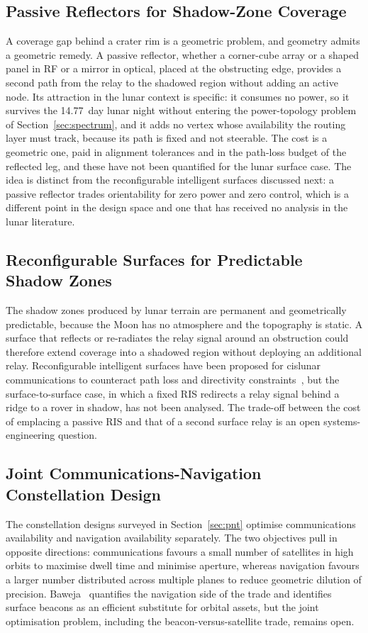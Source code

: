 \documentclass[11pt,a4paper]{article}
\begin{document}
\subsection{Passive Reflectors for Shadow-Zone Coverage}
A coverage gap behind a crater rim is a geometric problem, and geometry admits a geometric remedy. A passive reflector, whether a corner-cube array or a shaped panel in RF or a mirror in optical, placed at the obstructing edge, provides a second path from the relay to the shadowed region without adding an active node. Its attraction in the lunar context is specific: it consumes no power, so it survives the \SI{14.77}{day} lunar night without entering the power-topology problem of Section~\ref{sec:spectrum}, and it adds no vertex whose availability the routing layer must track, because its path is fixed and not steerable. The cost is a geometric one, paid in alignment tolerances and in the path-loss budget of the reflected leg, and these have not been quantified for the lunar surface case. The idea is distinct from the reconfigurable intelligent surfaces discussed next: a passive reflector trades orientability for zero power and zero control, which is a different point in the design space and one that has received no analysis in the lunar literature.

\subsection{Reconfigurable Surfaces for Predictable Shadow Zones}
The shadow zones produced by lunar terrain are permanent and geometrically predictable, because the Moon has no atmosphere and the topography is static. A surface that reflects or re-radiates the relay signal around an obstruction could therefore extend coverage into a shadowed region without deploying an additional relay. Reconfigurable intelligent surfaces have been proposed for cislunar communications to counteract path loss and directivity constraints~\cite{ris_cislunar2024}, but the surface-to-surface case, in which a fixed RIS redirects a relay signal behind a ridge to a rover in shadow, has not been analysed. The trade-off between the cost of emplacing a passive RIS and that of a second surface relay is an open systems-engineering question.

\subsection{Joint Communications-Navigation Constellation Design}
The constellation designs surveyed in Section~\ref{sec:pnt} optimise communications availability and navigation availability separately. The two objectives pull in opposite directions: communications favours a small number of satellites in high orbits to maximise dwell time and minimise aperture, whereas navigation favours a larger number distributed across multiple planes to reduce geometric dilution of precision. Baweja~\cite{baweja_dop} quantifies the navigation side of the trade and identifies surface beacons as an efficient substitute for orbital assets, but the joint optimisation problem, including the beacon-versus-satellite trade, remains open.
\end{document}
